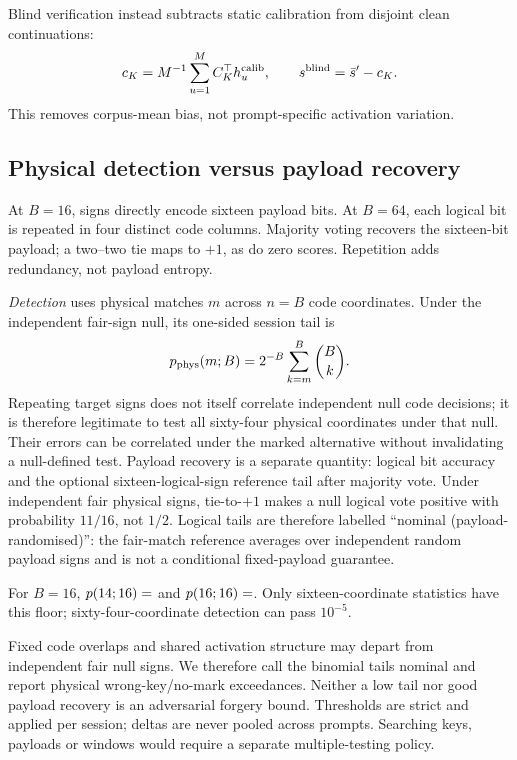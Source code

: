 \documentclass[11pt]{article}
\newcommand{\metric}[1]{\csname #1\endcsname}
\begin{document}
Blind verification instead subtracts static calibration from disjoint clean
continuations:
\begin{equation}
 c_K=M^{-1}\sum_{u=1}^{M}C_K^\top h_u^{\rm calib},\qquad
 s^{\rm blind}=\bar s'-c_K.
\end{equation}
This removes corpus-mean bias, not prompt-specific activation variation.
\ProtocolFinding

\subsection{Physical detection versus payload recovery}
At $B=16$, signs directly encode sixteen payload bits. At $B=64$, each logical
bit is repeated in four distinct code columns. Majority voting recovers the
sixteen-bit payload; a two--two tie maps to $+1$, as do zero scores. Repetition
adds redundancy, not payload entropy.

\emph{Detection} uses physical matches $m$ across $n=B$ code coordinates. Under
the independent fair-sign null, its one-sided session tail is
\begin{equation}
 p_{\rm phys}(m;B)=2^{-B}\sum_{k=m}^{B}{B\choose k}.\label{eq:p}
\end{equation}
Repeating target signs does not itself correlate independent null code decisions;
it is therefore legitimate to test all sixty-four physical coordinates under
that null. Their errors can be correlated under the marked alternative without
invalidating a null-defined test. Payload recovery is a separate quantity:
logical bit accuracy and the optional sixteen-logical-sign reference tail after
majority vote. Under independent fair physical signs, tie-to-$+1$ makes a null
logical vote positive with probability $11/16$, not $1/2$. Logical tails are therefore
labelled ``nominal (payload-randomised)'': the fair-match reference averages over
independent random payload signs and is not a conditional fixed-payload guarantee.

For $B=16$, $p(14;16)=\metric{Pvalue14}$ and
$p(16;16)=\metric{Pvalue16}$. Only sixteen-coordinate statistics have this floor;
sixty-four-coordinate detection can pass $10^{-5}$.

Fixed code overlaps and shared activation structure may depart from independent
fair null signs. We therefore call the binomial tails nominal and report physical
wrong-key/no-mark exceedances. Neither a low tail nor good payload recovery is an
adversarial forgery bound. Thresholds are strict and applied per session; deltas
are never pooled across prompts. Searching keys, payloads or windows would
require a separate multiple-testing policy.
\end{document}
